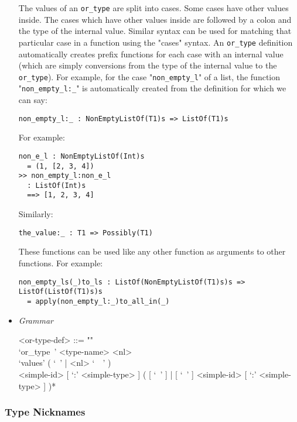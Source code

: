 \documentclass{article}
\begin{document}
\begin{itemize}
The values of an \verb|or_type| are split into cases. Some cases have other
values inside.  The cases which have other values inside are followed by a
colon and the type of the internal value. Similar syntax can be used for
matching that particular case in a function using the "cases" syntax.  An
\verb|or_type| definition automatically creates prefix functions for each
case with an internal value (which are simply conversions from the type of the
internal value to the \verb|or_type|).  For example, for the case
"\verb|non_empty_l|" of a list, the function "\verb|non_empty_l:_|" is
automatically created from the definition for which we can say:
\begin{verbatim}
non_empty_l:_ : NonEmptyListOf(T1)s => ListOf(T1)s
\end{verbatim}
For example:
\begin{verbatim}
non_e_l : NonEmptyListOf(Int)s
  = (1, [2, 3, 4])
>> non_empty_l:non_e_l
  : ListOf(Int)s
  ==> [1, 2, 3, 4]
\end{verbatim}
Similarly:
\begin{verbatim}
the_value:_ : T1 => Possibly(T1)
\end{verbatim}
These functions can be used like any other function as arguments to other
functions.  For example:
\begin{verbatim}
non_empty_ls(_)to_ls : ListOf(NonEmptyListOf(T1)s)s => ListOf(ListOf(T1)s)s
  = apply(non_empty_l:_)to_all_in(_)
\end{verbatim}

\item \textit{Grammar}

\begin{grammar}
<or-type-def> ::= ""\\
`or_type\ ' <type-name> <nl> \\
`values' ( `\ ' | <nl> `\ \ ' ) \\
<simple-id> [ `:' <simple-type> ]
( [ `\ ' ] | [ `\ ' ] <simple-id> [ `:' <simple-type> ] )*
\end{grammar}

\end{itemize}

\subsubsection{Type Nicknames}
\end{document}
